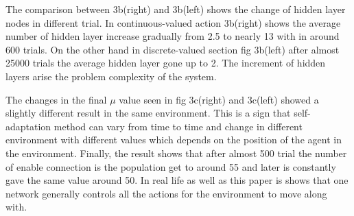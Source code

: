 \documentclass[12pt]{article}
\begin{document}
The comparison between 3b(right) and 3b(left) shows the change of hidden layer nodes in different trial.  In continuous-valued action 3b(right) shows the average number of hidden layer increase gradually from 2.5 to nearly 13 with in around 600 trials. On the other hand in discrete-valued section fig 3b(left) after almost 25000 trials the average hidden layer gone up to 2. The increment of hidden layers arise the problem complexity of the system. 

The changes in the final $\mu$ value seen in fig 3c(right) and 3c(left) showed a slightly different result in the same environment. This is a sign that self-adaptation method can vary from time to time and change in different environment with different values which depends on the position of the agent in the environment. Finally, the result shows that after almost 500 trial the number of enable connection is the population get to around 55 and later is constantly gave the same value around 50. In real life as well as this paper is shows that one network generally controls all the actions for the environment to move along with.
\end{document}
